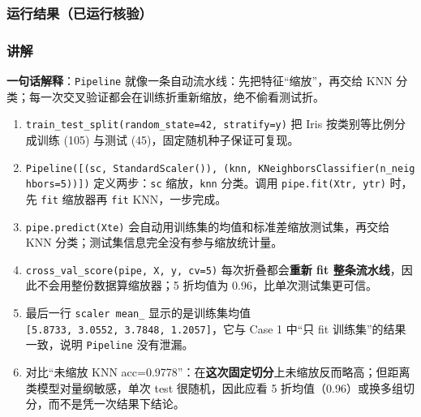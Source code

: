 \subsubsection{运行结果（已运行核验）}\label{ux8fd0ux884cux7ed3ux679cux5df2ux8fd0ux884cux6838ux9a8c-31}

\begin{Shaded}
\begin{Highlighting}[]
\end{Highlighting}
\end{Shaded}

\subsubsection{讲解}\label{ux8bb2ux89e3-30}

\textbf{一句话解释}：\texttt{Pipeline}
就像一条自动流水线：先把特征``缩放''，再交给 KNN
分类；每一次交叉验证都会在训练折重新缩放，绝不偷看测试折。

\begin{enumerate}
\def\labelenumi{\arabic{enumi}.}
\tightlist
\item
  \texttt{train\_test\_split(random\_state=42,\ stratify=y)} 把 Iris
  按类别等比例分成训练 (105) 与测试 (45)，固定随机种子保证可复现。
\item
  \texttt{Pipeline({[}(\textquotesingle{}sc\textquotesingle{},\ StandardScaler()),\ (\textquotesingle{}knn\textquotesingle{},\ KNeighborsClassifier(n\_neighbors=5)){]})}
  定义两步：\texttt{sc} 缩放，\texttt{knn} 分类。调用
  \texttt{pipe.fit(Xtr,\ ytr)} 时，先 \texttt{fit} 缩放器再 \texttt{fit}
  KNN，一步完成。
\item
  \texttt{pipe.predict(Xte)}
  会自动用训练集的均值和标准差缩放测试集，再交给 KNN
  分类；测试集信息完全没有参与缩放统计量。
\item
  \texttt{cross\_val\_score(pipe,\ X,\ y,\ cv=5)}
  每次折叠都会\textbf{重新 fit
  整条流水线}，因此不会用整份数据算缩放器；5 折均值为
  0.96，比单次测试集更可信。
\item
  最后一行 \texttt{scaler\ mean\_} 显示的是训练集均值
  \texttt{{[}5.8733,\ 3.0552,\ 3.7848,\ 1.2057{]}}，它与 Case 1 中``只
  fit 训练集''的结果一致，说明 \texttt{Pipeline} 没有泄漏。
\item
  对比``未缩放 KNN
  acc=0.9778''：在\textbf{这次固定切分}上未缩放反而略高；但距离类模型对量纲敏感，单次
  test 很随机，因此应看 5
  折均值（0.96）或换多组切分，而不是凭一次结果下结论。
\end{enumerate}

